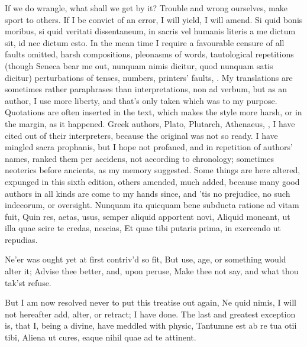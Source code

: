{If we do wrangle, what shall we get by it? Trouble and wrong ourselves,
make sport to others. If I be convict of an error, I will yield, I will
amend. Si quid bonis moribus, si quid veritati dissentaneum, in sacris
vel humanis literis a me dictum sit, id nec dictum esto. In the mean
time I require a favourable censure of all faults omitted, harsh
compositions, pleonasms of words, tautological repetitions (though
Seneca bear me out, nunquam nimis dicitur, quod nunquam satis dicitur)
perturbations of tenses, numbers, printers' faults, \etc. My translations
are sometimes rather paraphrases than interpretations, non ad verbum,
but as an author, I use more liberty, and that's only taken which was
to my purpose. Quotations are often inserted in the text, which makes
the style more harsh, or in the margin, as it happened. Greek authors,
Plato, Plutarch, Athenaeus, \etc, I have cited out of their
interpreters, because the original was not so ready. I have mingled
sacra prophanis, but I hope not profaned, and in repetition of authors'
names, ranked them per accidens, not according to chronology; sometimes
neoterics before ancients, as my memory suggested. Some things are here
altered, expunged in this sixth edition, others amended, much added,
because many good authors in all kinds are come to my hands since,
and 'tis no prejudice, no such indecorum, or oversight.
Nunquam ita quicquam bene subducta ratione ad vitam fuit,
Quin res, aetas, usus, semper aliquid apportent novi,
Aliquid moneant, ut illa quae scire te credas, nescias,
Et quae tibi putaris prima, in exercendo ut repudias.

Ne'er was ought yet at first contriv'd so fit,
But use, age, or something would alter it;
Advise thee better, and, upon peruse,
Make thee not say, and what thou tak'st refuse.

But I am now resolved never to put this treatise out again, Ne quid
nimis, I will not hereafter add, alter, or retract; I have done. The
last and greatest exception is, that I, being a divine, have meddled
with physic,
Tantumne est ab re tua otii tibi,
Aliena ut cures, eaque nihil quae ad te attinent.

}
